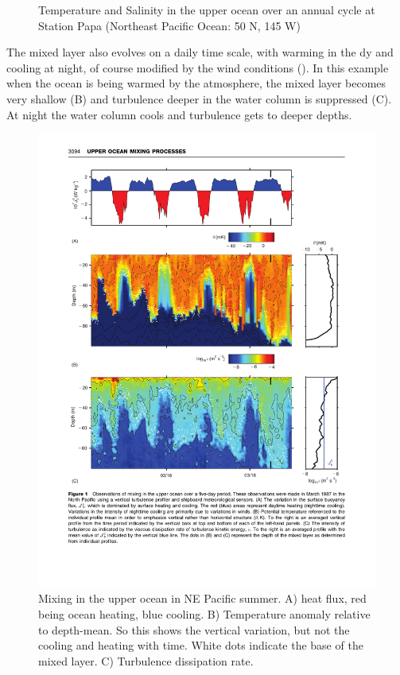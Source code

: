 \begin{figure}[htp]
    \caption{Temperature and Salinity in the upper ocean over an annual cycle at Station Papa (Northeast Pacific Ocean: 50 N, 145 W) \citep{Pellandetal16}}
    \label{fig:PellandEtAl}  
\end{figure}

The mixed layer also evolves on a daily time scale, with warming in the dy and cooling at night, of course modified by the wind conditions (). In this example when the ocean is being warmed by the atmosphere, the mixed layer becomes very shallow  (B) and turbulence deeper in the water column is suppressed (C).  At night the water column cools and turbulence gets to deeper depths.

\begin{figure}[htp]
  \centering
  \includegraphics[]{figs/WaterMasses/MoumSmyth01Fig1}
    \caption{Mixing in the upper ocean in NE Pacific summer. A) heat flux, red being ocean heating, blue cooling. B) Temperature anomaly relative to depth-mean.  So this shows the vertical variation, but not the cooling and heating with time.  White dots indicate the base of the mixed layer.  C) Turbulence dissipation rate.  }
    \label{fig:MoumSmyth01Fig1}  
\end{figure}

